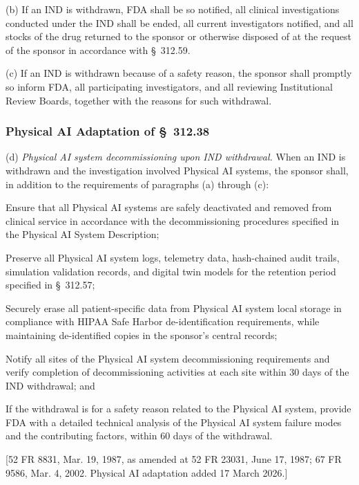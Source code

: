 (b) If an IND is withdrawn, FDA shall be so notified, all clinical investigations conducted under the IND shall be ended, all current investigators notified, and all stocks of the drug returned to the sponsor or otherwise disposed of at the request of the sponsor in accordance with \S~312.59.

(c) If an IND is withdrawn because of a safety reason, the sponsor shall promptly so inform FDA, all participating investigators, and all reviewing Institutional Review Boards, together with the reasons for such withdrawal.

\subsubsection{Physical AI Adaptation of \S~312.38}

(d) \textit{Physical AI system decommissioning upon IND withdrawal.} When an IND is withdrawn and the investigation involved Physical AI systems, the sponsor shall, in addition to the requirements of paragraphs (a) through (c):

\begin{description}[leftmargin=0.8cm,style=sameline]
\item[(i)] Ensure that all Physical AI systems are safely deactivated and removed from clinical service in accordance with the decommissioning procedures specified in the Physical AI System Description;
\item[(ii)] Preserve all Physical AI system logs, telemetry data, hash-chained audit trails, simulation validation records, and digital twin models for the retention period specified in \S~312.57;
\item[(iii)] Securely erase all patient-specific data from Physical AI system local storage in compliance with HIPAA Safe Harbor de-identification requirements, while maintaining de-identified copies in the sponsor's central records;
\item[(iv)] Notify all sites of the Physical AI system decommissioning requirements and verify completion of decommissioning activities at each site within 30 days of the IND withdrawal; and
\item[(v)] If the withdrawal is for a safety reason related to the Physical AI system, provide FDA with a detailed technical analysis of the Physical AI system failure modes and the contributing factors, within 60 days of the withdrawal.
\end{description}

[52 FR 8831, Mar. 19, 1987, as amended at 52 FR 23031, June 17, 1987; 67 FR 9586, Mar. 4, 2002. Physical AI adaptation added 17 March 2026.]

